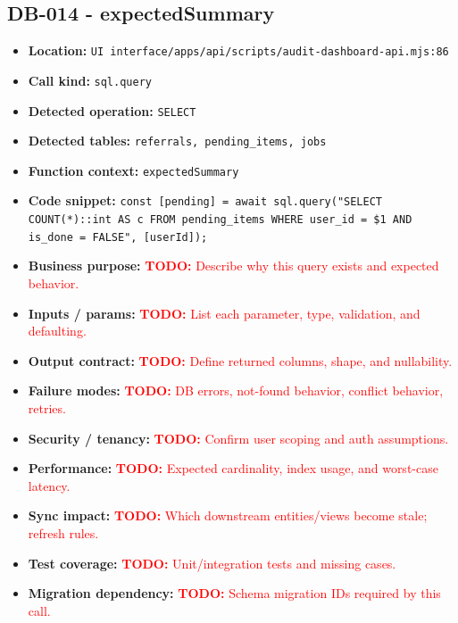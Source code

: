 \documentclass[11pt]{article}
\newcommand{\todoitem}[1]{\textcolor{red}{\textbf{TODO:} #1}}
\begin{document}
\subsection{DB-014 - expectedSummary}
\begin{itemize}[leftmargin=1.5em]
\item \textbf{Location:} \texttt{UI interface/apps/api/scripts/audit-dashboard-api.mjs:86}
\item \textbf{Call kind:} \texttt{sql.query}
\item \textbf{Detected operation:} \texttt{SELECT}
\item \textbf{Detected tables:} \texttt{referrals, pending\_items, jobs}
\item \textbf{Function context:} \texttt{expectedSummary}
\item \textbf{Code snippet:} \texttt{const [pending] = await sql.query("SELECT COUNT(*)::int AS c FROM pending\_items WHERE user\_id = \$1 AND is\_done = FALSE", [userId]);}
\item \textbf{Business purpose:} \todoitem{Describe why this query exists and expected behavior.}
\item \textbf{Inputs / params:} \todoitem{List each parameter, type, validation, and defaulting.}
\item \textbf{Output contract:} \todoitem{Define returned columns, shape, and nullability.}
\item \textbf{Failure modes:} \todoitem{DB errors, not-found behavior, conflict behavior, retries.}
\item \textbf{Security / tenancy:} \todoitem{Confirm user scoping and auth assumptions.}
\item \textbf{Performance:} \todoitem{Expected cardinality, index usage, and worst-case latency.}
\item \textbf{Sync impact:} \todoitem{Which downstream entities/views become stale; refresh rules.}
\item \textbf{Test coverage:} \todoitem{Unit/integration tests and missing cases.}
\item \textbf{Migration dependency:} \todoitem{Schema migration IDs required by this call.}
\end{itemize}
\end{document}

